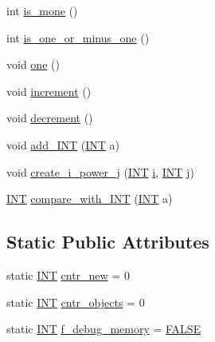\begin{DoxyCompactItemize}
int \mbox{\hyperlink{classlonginteger__object_ad748965e273fde8e59048d173cca5858}{is\+\_\+mone}} ()
\item 
int \mbox{\hyperlink{classlonginteger__object_a8aabeb698a8fc50464cd5da6c952c6f5}{is\+\_\+one\+\_\+or\+\_\+minus\+\_\+one}} ()
\item 
void \mbox{\hyperlink{classlonginteger__object_a42ab2cb2b99f33da5eacd84039fee701}{one}} ()
\item 
void \mbox{\hyperlink{classlonginteger__object_ae3fbaedb1a9fddcf0bf9facce9cd8ab7}{increment}} ()
\item 
void \mbox{\hyperlink{classlonginteger__object_a9c0e2494b9282e4263df3e130ab8f594}{decrement}} ()
\item 
void \mbox{\hyperlink{classlonginteger__object_af059ef23395f9d8e43b5a33a0db2340f}{add\+\_\+\+I\+NT}} (\mbox{\hyperlink{galois_8h_a09fddde158a3a20bd2dcadb609de11dc}{I\+NT}} a)
\item 
void \mbox{\hyperlink{classlonginteger__object_abd7f646a9077ab9a8c2754c221ae8e2a}{create\+\_\+i\+\_\+power\+\_\+j}} (\mbox{\hyperlink{galois_8h_a09fddde158a3a20bd2dcadb609de11dc}{I\+NT}} \mbox{\hyperlink{alphabet2_8_c_acb559820d9ca11295b4500f179ef6392}{i}}, \mbox{\hyperlink{galois_8h_a09fddde158a3a20bd2dcadb609de11dc}{I\+NT}} \mbox{\hyperlink{alphabet2_8_c_a37d972ae0b47b9099e30983131d31916}{j}})
\item 
\mbox{\hyperlink{galois_8h_a09fddde158a3a20bd2dcadb609de11dc}{I\+NT}} \mbox{\hyperlink{classlonginteger__object_a8396c10c8acef2fd2e2831d24db189b6}{compare\+\_\+with\+\_\+\+I\+NT}} (\mbox{\hyperlink{galois_8h_a09fddde158a3a20bd2dcadb609de11dc}{I\+NT}} a)
\end{DoxyCompactItemize}
\subsection*{Static Public Attributes}
\begin{DoxyCompactItemize}
\item 
static \mbox{\hyperlink{galois_8h_a09fddde158a3a20bd2dcadb609de11dc}{I\+NT}} \mbox{\hyperlink{classlonginteger__object_aeefe7e728a0c9fda11faa2d05e96fde0}{cntr\+\_\+new}} = 0
\item 
static \mbox{\hyperlink{galois_8h_a09fddde158a3a20bd2dcadb609de11dc}{I\+NT}} \mbox{\hyperlink{classlonginteger__object_a15690c1068b34d70fe20e1ce13e0b8f3}{cntr\+\_\+objects}} = 0
\item 
static \mbox{\hyperlink{galois_8h_a09fddde158a3a20bd2dcadb609de11dc}{I\+NT}} \mbox{\hyperlink{classlonginteger__object_ae0f4bd0c27639c7350a9b36d3cb32823}{f\+\_\+debug\+\_\+memory}} = \mbox{\hyperlink{nauty_8h_aa93f0eb578d23995850d61f7d61c55c1}{F\+A\+L\+SE}}
\end{DoxyCompactItemize}


